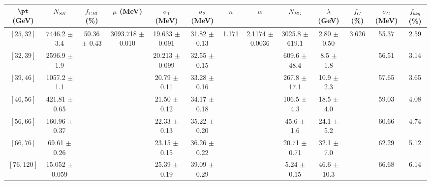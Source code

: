 \begin{tabular}{c||c|c|c|c|c|c|c|c|c|c|c||c}
$\pt$ (GeV) & $N_{SR}$ & $f_{CB1}$ (\%) & $\mu$ (MeV) & $\sigma_1$ (MeV) & $\sigma_2$ (MeV) & $n$ & $\alpha$ & $N_{BG}$ & $\lambda$ (GeV) & $f_G$ (\%) & $\sigma_G$ (MeV) & $f_{bkg}$ (\%) \\
\hline
$[25, 32]$ & 7446.2 $\pm$ 3.4 & \multirow{7}{*}{50.36 $\pm$ 0.43} & \multirow{7}{*}{3093.718 $\pm$ 0.010} & 19.633 $\pm$ 0.091 & 31.82 $\pm$ 0.13 & \multirow{7}{*}{1.171} & \multirow{7}{*}{2.1174 $\pm$ 0.0036} & 3025.8 $\pm$ 619.1 & 2.80 $\pm$ 0.50 & \multirow{7}{*}{3.626} & 55.37 & 2.59\\
$[32, 39]$ & 2596.9 $\pm$ 1.9 &  &  & 20.213 $\pm$ 0.099 & 32.55 $\pm$ 0.15 &  &  & 609.6 $\pm$ 48.4 & 8.5 $\pm$ 1.8 &  & 56.51 & 3.14\\
$[39, 46]$ & 1057.2 $\pm$ 1.1 &  &  & 20.79 $\pm$ 0.11 & 33.28 $\pm$ 0.16 &  &  & 267.8 $\pm$ 17.1 & 10.9 $\pm$ 2.3 &  & 57.65 & 3.65\\
$[46, 56]$ & 421.81 $\pm$ 0.65 &  &  & 21.50 $\pm$ 0.12 & 34.17 $\pm$ 0.18 &  &  & 106.5 $\pm$ 4.3 & 18.5 $\pm$ 4.0 &  & 59.03 & 4.08\\
$[56, 66]$ & 160.96 $\pm$ 0.37 &  &  & 22.33 $\pm$ 0.13 & 35.22 $\pm$ 0.20 &  &  & 45.6 $\pm$ 1.6 & 24.1 $\pm$ 5.2 &  & 60.66 & 4.74\\
$[66, 76]$ & 69.61 $\pm$ 0.26 &  &  & 23.15 $\pm$ 0.15 & 36.26 $\pm$ 0.22 &  &  & 20.71 $\pm$ 0.71 & 32.1 $\pm$ 7.0 &  & 62.29 & 5.12\\
$[76, 120]$ & 15.052 $\pm$ 0.059 &  &  & 25.39 $\pm$ 0.19 & 39.09 $\pm$ 0.29 &  &  & 5.24 $\pm$ 0.15 & 46.6 $\pm$ 10.3 &  & 66.68 & 6.14\\
\end{tabular}
